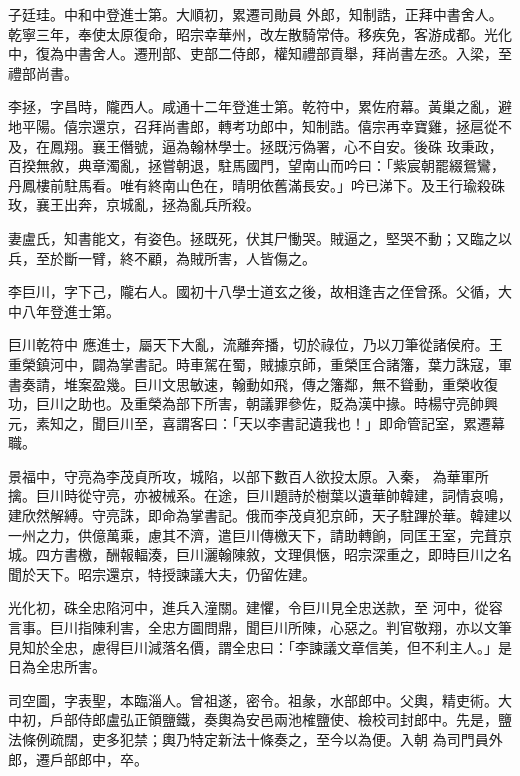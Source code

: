 \begin{pinyinscope}
 子廷珪。中和中登進士第。大順初，累遷司勛員
 外郎，知制誥，正拜中書舍人。乾寧三年，奉使太原復命，昭宗幸華州，改左散騎常侍。移疾免，客游成都。光化中，復為中書舍人。遷刑部、吏部二侍郎，權知禮部貢舉，拜尚書左丞。入梁，至禮部尚書。



 李拯，字昌時，隴西人。咸通十二年登進士第。乾符中，累佐府幕。黃巢之亂，避地平陽。僖宗還京，召拜尚書郎，轉考功郎中，知制誥。僖宗再幸寶雞，拯扈從不及，在鳳翔。襄王僭號，逼為翰林學士。拯既污偽署，心不自安。後硃
 玫秉政，百揆無敘，典章濁亂，拯嘗朝退，駐馬國門，望南山而吟曰：「紫宸朝罷綴鴛鸞，丹鳳樓前駐馬看。唯有終南山色在，晴明依舊滿長安。」吟已涕下。及王行瑜殺硃玫，襄王出奔，京城亂，拯為亂兵所殺。



 妻盧氏，知書能文，有姿色。拯既死，伏其尸慟哭。賊逼之，堅哭不動；又臨之以兵，至於斷一臂，終不顧，為賊所害，人皆傷之。



 李巨川，字下己，隴右人。國初十八學士道玄之後，故相逢吉之侄曾孫。父循，大中八年登進士第。



 巨川乾符中
 應進士，屬天下大亂，流離奔播，切於祿位，乃以刀筆從諸侯府。王重榮鎮河中，闢為掌書記。時車駕在蜀，賊據京師，重榮匡合諸籓，葉力誅寇，軍書奏請，堆案盈幾。巨川文思敏速，翰動如飛，傳之籓鄰，無不聳動，重榮收復功，巨川之助也。及重榮為部下所害，朝議罪參佐，貶為漢中掾。時楊守亮帥興元，素知之，聞巨川至，喜謂客曰：「天以李書記遺我也！」即命管記室，累遷幕職。



 景福中，守亮為李茂貞所攻，城陷，以部下數百人欲投太原。入秦，
 為華軍所擒。巨川時從守亮，亦被械系。在途，巨川題詩於樹葉以遺華帥韓建，詞情哀鳴，建欣然解縛。守亮誅，即命為掌書記。俄而李茂貞犯京師，天子駐蹕於華。韓建以一州之力，供億萬乘，慮其不濟，遣巨川傳檄天下，請助轉餉，同匡王室，完葺京城。四方書檄，酬報輻湊，巨川灑翰陳敘，文理俱愜，昭宗深重之，即時巨川之名聞於天下。昭宗還京，特授諫議大夫，仍留佐建。



 光化初，硃全忠陷河中，進兵入潼關。建懼，令巨川見全忠送款，至
 河中，從容言事。巨川指陳利害，全忠方圖問鼎，聞巨川所陳，心惡之。判官敬翔，亦以文筆見知於全忠，慮得巨川減落名價，謂全忠曰：「李諫議文章信美，但不利主人。」是日為全忠所害。



 司空圖，字表聖，本臨淄人。曾祖遂，密令。祖彖，水部郎中。父輿，精吏術。大中初，戶部侍郎盧弘正領鹽鐵，奏輿為安邑兩池榷鹽使、檢校司封郎中。先是，鹽法條例疏闊，吏多犯禁；輿乃特定新法十條奏之，至今以為便。入朝
 為司門員外郎，遷戶部郎中，卒。




\end{pinyinscope}
